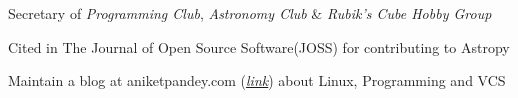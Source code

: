 \documentclass[]{deedy-resume-openfont}
\begin{document}
\begin{minipage}[t]{0.70\textwidth}
\begin{tightemize}
    \item Secretary of \textit{Programming Club}, \textit{Astronomy Club} \& \textit{Rubik's Cube Hobby Group}
    \item Cited in The Journal of Open Source Software(JOSS) for contributing to Astropy\textsuperscript{\texttrademark}
    \item Maintain a blog at aniketpandey.com (\textit{\href{http://aniketpandey.com/homepage}{link}}) about Linux, Programming and VCS
\end{tightemize}

\end{minipage} 
\end{document}
